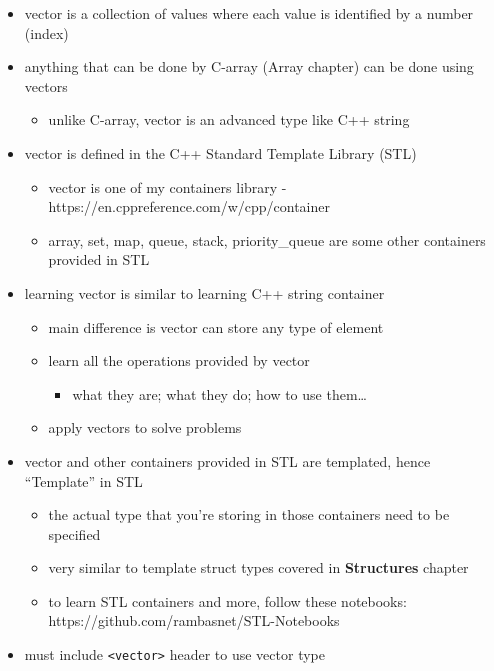 \documentclass[11pt]{article}
\providecommand{\tightlist}{%
      \setlength{\itemsep}{0pt}\setlength{\parskip}{0pt}}
\begin{document}
\begin{itemize}
\tightlist
\item
  vector is a collection of values where each value is identified by a
  number (index)
\item
  anything that can be done by C-array (Array chapter) can be done using
  vectors

  \begin{itemize}
  \tightlist
  \item
    unlike C-array, vector is an advanced type like C++ string
  \end{itemize}
\item
  vector is defined in the C++ Standard Template Library (STL)

  \begin{itemize}
  \tightlist
  \item
    vector is one of my containers library -
    https://en.cppreference.com/w/cpp/container
  \item
    array, set, map, queue, stack, priority\_queue are some other
    containers provided in STL
  \end{itemize}
\item
  learning vector is similar to learning C++ string container

  \begin{itemize}
  \tightlist
  \item
    main difference is vector can store any type of element
  \item
    learn all the operations provided by vector

    \begin{itemize}
    \tightlist
    \item
      what they are; what they do; how to use them\ldots{}
    \end{itemize}
  \item
    apply vectors to solve problems
  \end{itemize}
\item
  vector and other containers provided in STL are templated, hence
  ``Template'' in STL

  \begin{itemize}
  \tightlist
  \item
    the actual type that you're storing in those containers need to be
    specified
  \item
    very similar to template struct types covered in \textbf{Structures}
    chapter
  \item
    to learn STL containers and more, follow these notebooks:
    https://github.com/rambasnet/STL-Notebooks
  \end{itemize}
\item
  must include \texttt{\textless{}vector\textgreater{}} header to use
  vector type
\end{itemize}
\end{document}
